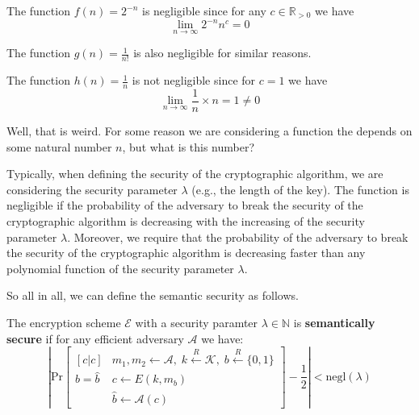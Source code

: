 \documentclass[../lecture-notes.tex]{subfiles}
\begin{document}
\begin{example}
    The function $f(n) = 2^{-n}$ is negligible since for any $c \in \mathbb{R}_{>0}$ we have
    \begin{equation}
        \lim_{n \to \infty} 2^{-n}n^c = 0
    \end{equation}

    The function $g(n) = \frac{1}{n!}$ is also negligible for similar reasons.
\end{example}

\begin{example}
    The function $h(n) = \frac{1}{n}$ is not negligible since for $c = 1$ we have
    \begin{equation}
        \lim_{n \to \infty} \frac{1}{n} \times n = 1 \neq 0
    \end{equation}
\end{example}

Well, that is weird. For some reason we are considering a function the depends on some natural number $n$, but what is this number?

Typically, when defining the security of the cryptographic algorithm, we are considering the security parameter $\lambda$ (e.g., the length of the key). The function is negligible if the probability of the adversary to break the security of the cryptographic algorithm is decreasing with the increasing of the security parameter $\lambda$. Moreover, we require that the probability of the adversary to break the security of the cryptographic algorithm is decreasing faster than any polynomial function of the security parameter $\lambda$.

So all in all, we can define the semantic security as follows.

\begin{definition}
    The encryption scheme $\mathcal{E}$ with a security paramter $\lambda \in \mathbb{N}$ is \textbf{semantically secure} if for any efficient adversary $\mathcal{A}$ we have:
    \begin{equation}
        \left|\text{Pr}\begin{bmatrix}[c|c]
            & m_1, m_2 \gets \mathcal{A}, \; k \xleftarrow{R} \mathcal{K}, \; b \xleftarrow{R} \{0,1\} \\
            b = \hat{b} & c \gets E(k,m_b) \\
            &\hat{b} \gets \mathcal{A}(c)
        \end{bmatrix} - \frac{1}{2}\right| < \text{negl}(\lambda)
    \end{equation}
\end{definition}
\end{document}

